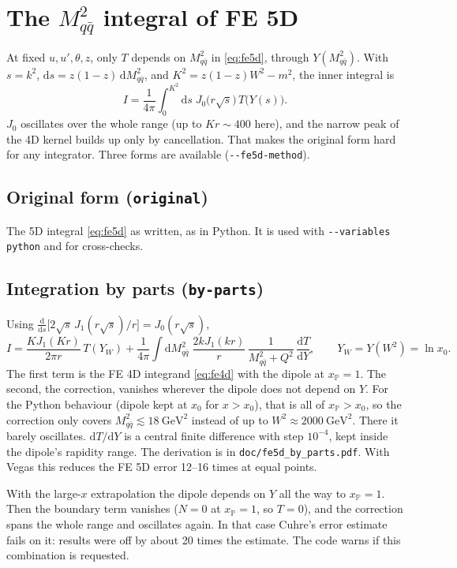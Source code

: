 \documentclass[11pt,a4paper]{article}
\newcommand{\Mqq}{M_{q\bar q}^2}
\newcommand{\dd}{\mathrm{d}}
\newcommand{\xP}{x_{\mathbb{P}}}
\newcommand{\code}[1]{\texttt{#1}}
\newcommand{\opt}[1]{\texttt{-{}-#1}}
\begin{document}
\section{The \texorpdfstring{$\Mqq$}{M2} integral of FE 5D}
\label{sec:fe5d}

At fixed $u, u', \theta, z$, only $T$ depends on $\Mqq$ in \eqref{eq:fe5d},
through $Y(\Mqq)$. With $s = k^2$, $\dd s = z(1-z)\,\dd\Mqq$, and
$K^2 = z(1-z)W^2 - m^2$, the inner integral is
\begin{equation}
  I = \frac{1}{4\pi} \int_0^{K^2} \dd s \; J_0\big(r\sqrt{s}\big) \, T\big(Y(s)\big) .
  \label{eq:inner}
\end{equation}
$J_0$ oscillates over the whole range (up to $K r \sim 400$ here), and the
narrow peak of the 4D kernel builds up only by cancellation. That makes the
original form hard for any integrator. Three forms are available
(\opt{fe5d-method}).

\subsection{Original form (\code{original})}
The 5D integral \eqref{eq:fe5d} as written, as in Python. It is used with
\opt{variables python} and for cross-checks.

\subsection{Integration by parts (\code{by-parts})}
Using $\frac{\dd}{\dd s}\big[2\sqrt{s}\,J_1(r\sqrt{s})/r\big] = J_0(r\sqrt{s})$,
\begin{equation}
  I = \frac{K J_1(K r)}{2\pi r}\, T(Y_W)
    + \frac{1}{4\pi} \int \dd\Mqq \; \frac{2kJ_1(kr)}{r} \,
      \frac{1}{\Mqq + Q^2} \, \frac{\dd T}{\dd Y} ,
  \qquad Y_W = Y(W^2) = \ln x_0 .
\end{equation}
The first term is the FE 4D integrand \eqref{eq:fe4d} with the dipole at
$\xP = 1$. The second, the correction, vanishes wherever the dipole does not
depend on $Y$. For the Python behaviour (dipole kept at $x_0$ for $x > x_0$),
that is all of $\xP > x_0$, so the correction only covers
$\Mqq \lesssim 18\ \text{GeV}^2$ instead of up to $W^2 \approx 2000\
\text{GeV}^2$. There it barely oscillates. $\dd T/\dd Y$ is a central finite
difference with step $10^{-4}$, kept inside the dipole's rapidity range. The
derivation is in \code{doc/fe5d\_by\_parts.pdf}. With Vegas this reduces the
FE 5D error 12--16 times at equal points.

With the large-$x$ extrapolation the dipole depends on $Y$ all the way to
$\xP = 1$. Then the boundary term vanishes ($N = 0$ at $\xP = 1$, so $T = 0$),
and the correction spans the whole range and oscillates again. In that case
Cuhre's error estimate fails on it: results were off by about 20 times the
estimate. The code warns if this combination is requested.
\end{document}
